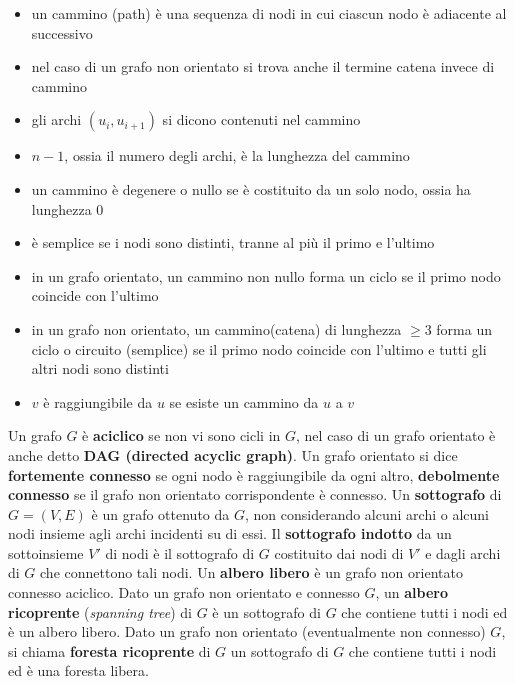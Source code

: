\documentclass[12pt]{article}
\begin{document}
\begin{itemize}
    \item un cammino (path) è una sequenza di nodi in cui ciascun nodo è adiacente al successivo
    \item nel caso di un grafo non orientato si trova anche il termine catena invece di cammino
    \item gli archi $(u_{i},u_{i+1})$ si dicono contenuti nel cammino
    \item $n-1$, ossia il numero degli archi, è la lunghezza del cammino
    \item un cammino è degenere o nullo se è costituito da un solo nodo, ossia ha lunghezza 0
    \item è semplice se i nodi sono distinti, tranne al più il primo e l'ultimo
    \item in un grafo orientato, un cammino non nullo forma un ciclo se il primo nodo coincide con l'ultimo
    \item in un grafo non orientato, un cammino(catena) di lunghezza $\geq$3 forma un ciclo o circuito (semplice) se il primo nodo coincide con l'ultimo e tutti gli altri nodi sono distinti
    \item $v$ è raggiungibile da $u$ se esiste un cammino da $u$ a $v$
\end{itemize}
Un grafo $G$ è \textbf{aciclico} se non vi sono cicli in $G$, nel caso di un grafo orientato è anche detto \textbf{DAG (directed acyclic graph)}. Un grafo orientato si dice \textbf{fortemente connesso} se ogni nodo è raggiungibile da ogni altro, \textbf{debolmente connesso} se il grafo non orientato corrispondente è connesso. Un \textbf{sottografo} di $G=(V,E)$ è un grafo ottenuto da $G$, non considerando alcuni archi o alcuni nodi insieme agli archi incidenti su di essi. Il \textbf{sottografo indotto} da un sottoinsieme $V'$ di nodi è il sottografo di $G$ costituito dai nodi di $V'$ e dagli archi di $G$ che connettono tali nodi. Un \textbf{albero libero} è un  grafo non orientato connesso aciclico. Dato un grafo non orientato e connesso $G$, un \textbf{albero ricoprente} (\textit{spanning tree}) di $G$ è un sottografo di $G$ che contiene tutti i nodi ed è un albero libero. Dato un grafo non orientato (eventualmente non connesso) $G$, si chiama \textbf{foresta ricoprente} di $G$ un sottografo di $G$ che contiene tutti i nodi ed è una foresta libera.
\end{document}
